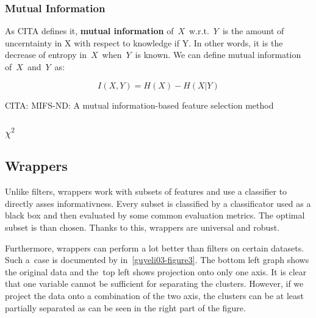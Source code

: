 \subsubsection{Mutual Information}

As CITA defines it, {\bf mutual information} of~$X$~w.r.t.~$Y$~is the amount of uncerntainty in X with respect to knowledge if Y.
In other words, it is the decrease of entropy in~$X$~when~$Y$~is known.
We can define mutual information of~$X$~and~$Y$~as:

$$I(X, Y) = H(X) - H(X|Y)$$




CITA: MIFS-ND: A mutual information-based feature selection method


\subsubsection{$\chi^2$}




\subsection{Wrappers}

Unlike filters, wrappers work with subsets of features and use a classifier to directly asses informativness.
Every subset is classified by a classificator used as a black box and then evaluated by some common evaluation metrics.
The optimal subset is than chosen. Thanks to this, wrappers are universal and robust.

Furthermore, wrappers can perform a lot better than filters on certain datasets. Such a~case is documented by \citet{GuyEli03} in~\ref{guyeli03-figure3}. The bottom left graph shows the original data and the~top left shows projection onto only one axis. It is clear that one variable cannot be sufficient for separating the clusters. However, if we project the data onto a combination of the two axis, the clusters can be at least partially separated as can be seen in the right part of the figure.
 

